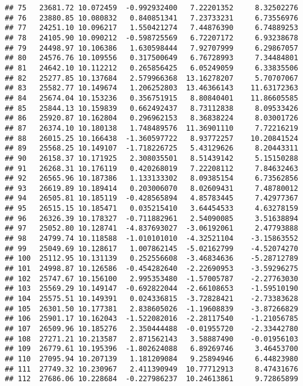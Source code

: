 \documentclass[
]{article}
\begin{document}
\begin{verbatim}
## 75   23681.72 10.072459  -0.992932400   7.22201352     8.32502276
## 76   23880.85 10.080832   0.840851341   7.23733231     6.73556976
## 77   24251.10 10.096217   1.550421274   7.44876390     6.74889253
## 78   24105.90 10.090212  -0.598725569   6.72207172     6.93238678
## 79   24498.97 10.106386   1.630598444   7.92707999     6.29867057
## 80   24576.76 10.109556   0.317500649   6.76728993     7.34484801
## 81   24642.10 10.112212   0.265856425   6.05249059     6.33835506
## 82   25277.85 10.137684   2.579966368  13.16278207     5.70707067
## 83   25582.77 10.149674   1.206252803  13.46366143    11.63172363
## 84   25674.04 10.153236   0.356751915   8.80840401    11.86605585
## 85   25844.13 10.159839   0.662492437   8.73112838     8.09533426
## 86   25920.87 10.162804   0.296962153   8.36838224     8.03001726
## 87   26374.10 10.180138   1.748489576  11.36901110     7.72216219
## 88   26015.25 10.166438  -1.360597722   8.93772257    10.20841524
## 89   25568.25 10.149107  -1.718226725   5.43129626     8.20443311
## 90   26158.37 10.171925   2.308035501   8.51439142     5.15150288
## 91   26268.31 10.176119   0.420268019   7.22208112     7.84632463
## 92   26565.96 10.187386   1.133133302   8.09385154     6.73562856
## 93   26619.89 10.189414   0.203006070   8.02609431     7.48780012
## 94   26505.81 10.185119  -0.428565894   4.85783445     7.42977367
## 95   26515.15 10.185471   0.035215410   3.64454533     4.63278159
## 96   26326.39 10.178327  -0.711882961   2.54090085     3.51638894
## 97   25052.80 10.128741  -4.837693027  -3.06192061     2.47793888
## 98   24799.74 10.118588  -1.010101010  -4.32521104    -3.15863552
## 99   25049.69 10.128617   1.007862145  -5.02162799    -4.52074270
## 100  25112.95 10.131139   0.252556608  -3.46834636    -5.28712789
## 101  24998.87 10.126586  -0.454282640  -2.22690953    -3.59296275
## 102  25747.67 10.156100   2.995353480  -1.57005787    -2.27763030
## 103  25569.29 10.149147  -0.692822044  -2.66108653    -1.59510190
## 104  25575.51 10.149391   0.024336815  -3.72828421    -2.73383628
## 105  26301.50 10.177381   2.838605026  -1.19608839    -3.87266829
## 106  25901.17 10.162043  -1.522082016  -2.28117540    -1.21056785
## 107  26509.96 10.185276   2.350444488  -0.01955720    -2.33442780
## 108  27271.21 10.213587   2.871562143   3.58887490    -0.01956103
## 109  26779.61 10.195396  -1.802624088   6.89269746     3.46453700
## 110  27095.94 10.207139   1.181209084   9.25894946     6.44823980
## 111  27749.32 10.230967   2.411390949  10.77712913     8.47431676
## 112  27686.06 10.228684  -0.227986237  10.24613861     9.72865899

\end{verbatim}
\end{document}
